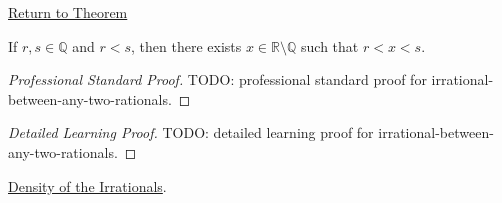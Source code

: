 \newpage
{}
\label{prf:irrational-between-any-two-rationals}

\begin{remark*}[Return]
\hyperref[thm:irrational-between-any-two-rationals]{Return to Theorem}
\end{remark*}

\begin{theorem*}
If $r,s\in\mathbb{Q}$ and $r<s$, then there exists
$x\in\mathbb{R}\setminus\mathbb{Q}$ such that $r<x<s$.
\end{theorem*}

\begin{proof}[Professional Standard Proof]
\LRAProofBodyStart
TODO: professional standard proof for irrational-between-any-two-rationals.
\end{proof}

\begin{proof}[Detailed Learning Proof]
\LRAProofBodyStart
TODO: detailed learning proof for irrational-between-any-two-rationals.
\end{proof}

\begin{remark*}
\end{remark*}

\begin{dependencies}
\hyperref[thm:density-of-irrationals-in-reals]{Density of the Irrationals}.
\end{dependencies}

\clearpage
